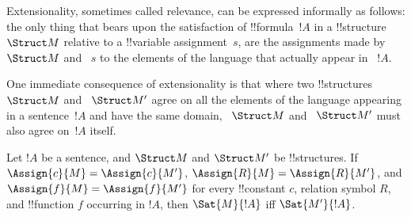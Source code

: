 \documentclass[../../include/open-logic-section]{subfiles}
\begin{document}


\begin{explain}
Extensionality, sometimes called relevance, can be expressed
informally as follows: the only thing that bears upon the satisfaction
of !!{formula}~$!A$ in a !!{structure}~$\Struct M$ relative to a
!!{variable} assignment~$s$, are the assignments made by ~$\Struct M$
and ~$s$ to the elements of the language that actually appear in
~$!A$.

One immediate consequence of extensionality is that where two
!!{structure}s~$\Struct M$ and ~$\Struct M'$ agree on all the elements
of the language appearing in a sentence~$!A$ and have the same domain,
~$\Struct M$ and ~$\Struct M'$ must also agree on~$!A$ itself.
\end{explain}

\begin{prop}[Extensionality]
Let $!A$ be a sentence, and $\Struct M$ and $\Struct M'$ be !!{structure}s. 
If $\Assign{c}{M} = \Assign{c}{M'}$, $\Assign{R}{M}=\Assign{R}{M'}$, and 
$\Assign{f}{M} = \Assign{f}{M'}$ for every !!{constant} $c$, relation 
symbol $R$, and !!{function} $f$ occurring in $!A$, then $\Sat{M}{!A}$ 
iff $\Sat{M'}{!A}$.
\end{prop}
\end{document}

